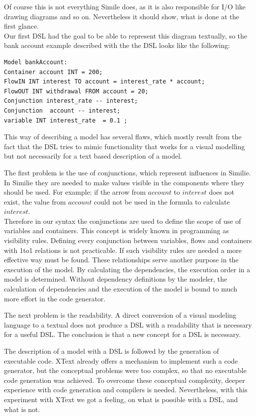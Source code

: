 \par
Of course this is not everything Simile does, as it is also responsible for I/O like drawing diagrams and so on. Nevertheless it should show, what is done at the first glance.\\
Our first DSL had the goal to be able to represent this diagram textually, so the bank account example described with the the DSL looks like the following:
\begin{lstlisting}
Model bankAccount:
Container account INT = 200;
FlowIN INT interest TO account = interest_rate * account;
FlowOUT INT withdrawal FROM account = 20;
Conjunction interest_rate -- interest;
Conjunction  account -- interest;
variable INT interest_rate  = 0.1 ;
\end{lstlisting}
\par
This way of describing a model has several flaws, which mostly result  from the fact that the DSL tries to mimic functionality that works for a visual modelling but not necessarily for a text based description of a model.
\par
The first problem is the use of conjunctions, which represent influences in Similie. In Similie they are needed to make values visible in the components where they should be used. For example: if the arrow from $account$ to $interest$ does not exist, the value from $account$ could not be used in the formula to calculate $interest$.\\
Therefore in our syntax the conjunctions are used to define the scope of use of variables and containers. This concept is widely known in programming as visibility rules. Defining every conjunction between variables, flows and containers with 1to1 relations is not practicable. If such visibility rules are needed a more effective way must be found.
These relationships serve another purpose in the execution of the model. By calculating the dependencies, the execution order in a model is determined. Without dependency definitions by the modeler, the calculation of dependencies and the execution of the model is bound to much more effort in the code generator.
\par
The next problem is the readability. A direct conversion of a visual modeling language to a textual does not produce a DSL with a readability that is necessary for a useful DSL. The conclusion is that a new concept for a DSL is necessary.
\par
The description of a model with a DSL is followed by the generation of executable code. XText already offers a mechanism to implement such a code generator, but the conceptual problems were too complex, so that no executable code generation was achieved. To overcome these conceptual complexity, deeper experience with code generation and compilers is needed. Nevertheless, with this experiment with XText we got a feeling, on what is possible with a DSL, and what is not. 
